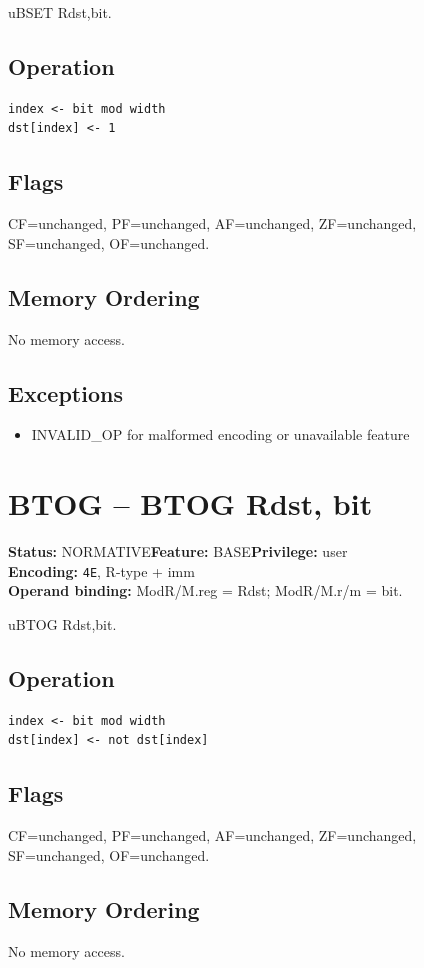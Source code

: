 \documentclass[10pt]{article}
\begin{document}
uBSET Rdst,bit.

\subsection*{Operation}
\begin{lstlisting}
index <- bit mod width
dst[index] <- 1
\end{lstlisting}
\subsection*{Flags}
CF=unchanged, PF=unchanged, AF=unchanged, ZF=unchanged, SF=unchanged, OF=unchanged.
\subsection*{Memory Ordering}
No memory access.
\subsection*{Exceptions}
\begin{itemize}
\item INVALID\_OP for malformed encoding or unavailable feature
\end{itemize}
\clearpage

\section{BTOG -- BTOG Rdst, bit}
\textbf{Status:} NORMATIVE\quad \textbf{Feature:} BASE\quad \textbf{Privilege:} user\\
\textbf{Encoding:} \texttt{4E}, R-type + imm\\
\textbf{Operand binding:} ModR/M.reg = Rdst; ModR/M.r/m = bit.

uBTOG Rdst,bit.

\subsection*{Operation}
\begin{lstlisting}
index <- bit mod width
dst[index] <- not dst[index]
\end{lstlisting}
\subsection*{Flags}
CF=unchanged, PF=unchanged, AF=unchanged, ZF=unchanged, SF=unchanged, OF=unchanged.
\subsection*{Memory Ordering}
No memory access.
\end{document}
